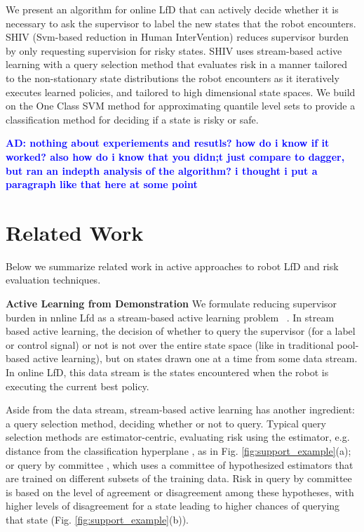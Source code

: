 \documentclass[10pt, conference]{ieeeconf}      %
\newcommand{\adnote}[1]{\ifthenelse{ \boolean{include-notes}}%
 {\textcolor{blue}{\textbf{AD: #1}}}{}}
\begin{document}
We present an algorithm for online LfD that can actively decide whether it is necessary to ask the supervisor to label the new states that the robot encounters. SHIV  (Svm-based reduction in Human InterVention) reduces supervisor burden by only requesting supervision for risky states. SHIV uses stream-based active learning with a query selection method that evaluates risk in a manner tailored to the non-stationary state distributions the robot encounters as it iteratively executes learned policies, and tailored to high dimensional state spaces. We build on the One Class SVM method for approximating quantile level sets \cite{scholkopf2001estimating} to provide a classification method for deciding if a state is risky or safe.


\adnote{nothing about experiements and resutls? how do i know if it worked? also how do i know that you didn;t just compare to dagger, but ran an indepth analysis of the algorithm? i thought i put a paragraph like that here at some point}



\section{Related Work}
Below we summarize related work in active approaches to robot LfD and risk evaluation techniques.

\noindent\textbf{Active Learning from Demonstration}
We formulate reducing supervisor burden in nnline Lfd as a stream-based active learning problem ~\cite{atlas1990training,cohn1994improving}. In stream based active learning, the decision of whether to query the supervisor (for a label or control signal) or not is not over the entire state space (like in traditional pool-based active learning), but on states drawn one at a time from some data stream. In  online LfD, this data stream is the states encountered when the robot is executing the current best policy.

Aside from the data stream, stream-based active learning has another ingredient: a query selection method, deciding whether or not to query. Typical query selection methods are estimator-centric, evaluating risk using the estimator, e.g. distance from the classification hyperplane \cite{tong2002support}, as in Fig. \ref{fig:support_example}(a); or query by committee  \cite{breiman1996bagging}, which uses a committee of hypothesized estimators that are trained on different subsets of the training data. Risk in query by committee is based on the level of agreement or disagreement among these hypotheses, with higher levels of disagreement for a state leading to higher chances of querying that state (Fig. \ref{fig:support_example}(b)).
\end{document}
